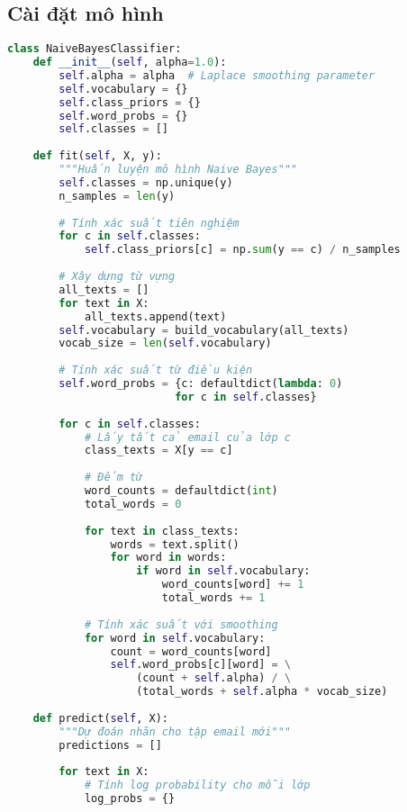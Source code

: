 \subsection{Cài đặt mô hình}

\begin{lstlisting}[language=Python]
class NaiveBayesClassifier:
    def __init__(self, alpha=1.0):
        self.alpha = alpha  # Laplace smoothing parameter
        self.vocabulary = {}
        self.class_priors = {}
        self.word_probs = {}
        self.classes = []
        
    def fit(self, X, y):
        """Huấn luyện mô hình Naive Bayes"""
        self.classes = np.unique(y)
        n_samples = len(y)
        
        # Tính xác suất tiên nghiệm
        for c in self.classes:
            self.class_priors[c] = np.sum(y == c) / n_samples
            
        # Xây dựng từ vựng
        all_texts = []
        for text in X:
            all_texts.append(text)
        self.vocabulary = build_vocabulary(all_texts)
        vocab_size = len(self.vocabulary)
        
        # Tính xác suất từ điều kiện
        self.word_probs = {c: defaultdict(lambda: 0) 
                          for c in self.classes}
        
        for c in self.classes:
            # Lấy tất cả email của lớp c
            class_texts = X[y == c]
            
            # Đếm từ
            word_counts = defaultdict(int)
            total_words = 0
            
            for text in class_texts:
                words = text.split()
                for word in words:
                    if word in self.vocabulary:
                        word_counts[word] += 1
                        total_words += 1
            
            # Tính xác suất với smoothing
            for word in self.vocabulary:
                count = word_counts[word]
                self.word_probs[c][word] = \
                    (count + self.alpha) / \
                    (total_words + self.alpha * vocab_size)
                    
    def predict(self, X):
        """Dự đoán nhãn cho tập email mới"""
        predictions = []
        
        for text in X:
            # Tính log probability cho mỗi lớp
            log_probs = {}
            

\end{lstlisting}
